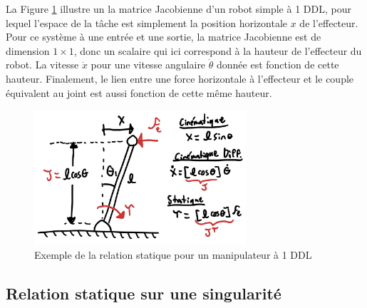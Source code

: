 \begin{example}

La Figure \ref{fig:static1dofexemple} illustre un la matrice Jacobienne d'un robot simple à 1 DDL, pour lequel l'espace de la tâche est simplement la position horizontale $x$ de l'effecteur. Pour ce système à une entrée et une sortie, la matrice Jacobienne est de dimension $1\times1$, donc un scalaire qui ici correspond à la hauteur de l'effecteur du robot. La vitesse $\dot{x}$ pour une vitesse angulaire $\dot{\theta}$ donnée est fonction de cette hauteur. Finalement, le lien entre une force horizontale à l'effecteur et le couple équivalent au joint est aussi fonction de cette même hauteur. 

\begin{figure}[H]
	\centering
		\includegraphics[width=0.70\textwidth]{fig/static1dofexemple.jpg}
	\caption{Exemple de la relation statique pour un manipulateur à 1 DDL}
	\label{fig:static1dofexemple}
\end{figure}
\end{example}

\subsection{Relation statique sur une singularité}

